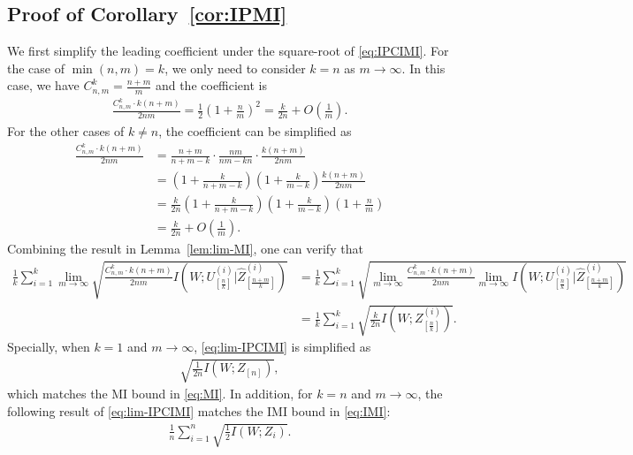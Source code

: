 \documentclass[onecolumn,romanappendices,10pt]{IEEEtran}
\begin{document}
	\subsection{Proof of Corollary~\ref{cor:IPMI}} \label{subsec:proof-IPMI}
	We first simplify the leading coefficient under the square-root of \eqref{eq:IPCIMI}. For the case of $\min(n, m) = k$, we only need to consider $k = n$ as $m \to \infty$. In this case, we have $C^k_{n,m} = \frac{n+m}{m}$ and the coefficient is
	\begin{equation}
		\begin{aligned}
			\frac{C_{n, m}^k \cdot k(n+m)}{2nm} = \frac{1}{2}\left( 1+\frac{n}{m} \right)^2 = \frac{k}{2n} + O\left( \frac{1}{m} \right).
		\end{aligned}
	\end{equation}
	For the other cases of $k \not= n$, the coefficient can be simplified as
	\begin{equation}
		\begin{aligned}
			\frac{C_{n, m}^k \cdot k(n+m)}{2nm} &= \frac{n+m}{n+m-k} \cdot \frac{nm}{nm - k n} \cdot \frac{k(n+m)}{2nm} \\
			&= \left( 1 + \frac{k}{n+m-k} \right) \left( 1 + \frac{k}{m - k} \right) \frac{k(n+m)}{2nm} \\
			&= \frac{k}{2n} \left( 1 + \frac{k}{n+m-k} \right) \left( 1 + \frac{k}{m - k} \right) \left( 1 + \frac{n}{m} \right) \\
			&= \frac{k}{2n} + O\left( \frac{1}{m} \right).
		\end{aligned}
	\end{equation}
	Combining the result in Lemma~\ref{lem:lim-MI}, one can verify that
	\begin{equation}
		\begin{aligned}
			\frac{1}{k} \sum_{i=1}^{k} \lim_{m \to \infty} \sqrt{\frac{C_{n, m}^k \cdot k(n+m)}{2nm} I\left( W; U^{(i)}_{[\frac{n}{k}]} | \hat{Z}^{(i)}_{[\frac{n+m}{k}]} \right)} &= \frac{1}{k} \sum_{i=1}^{k} \sqrt{\lim_{m \to \infty} \frac{C_{n, m}^k \cdot k(n+m)}{2nm} \lim_{m \to \infty} I\left( W; U^{(i)}_{[\frac{n}{k}]} | \hat{Z}^{(i)}_{[\frac{n+m}{k}]} \right)} \\
			&= \frac{1}{k} \sum_{i=1}^{k} \sqrt{\frac{k}{2n} I\left( W; Z^{(i)}_{[\frac{n}{k}]} \right)}.
		\end{aligned}\label{eq:lim-IPCIMI}
	\end{equation}
	Specially, when $k = 1$ and $m \to \infty$, \eqref{eq:lim-IPCIMI} is simplified as
	\begin{equation}
		\begin{aligned}
			\sqrt{\frac{1}{2n} I\left( W; Z_{[n]} \right)},
		\end{aligned}
	\end{equation}
	which matches the MI bound in \eqref{eq:MI}. In addition, for $k = n$ and $m \to \infty$, the following result of \eqref{eq:lim-IPCIMI} matches the IMI bound in \eqref{eq:IMI}:
	\begin{equation}
		\begin{aligned}
			\frac{1}{n} \sum_{i=1}^{n} \sqrt{\frac{1}{2} I\left( W; Z_i \right)}.
		\end{aligned}
	\end{equation}
	
\end{document}

